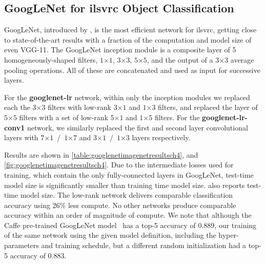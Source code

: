 \documentclass[thesis]{subfiles}
\begin{document}
    \subsection{GoogLeNet for \gls{ilsvrc} Object Classification}
    GoogLeNet, introduced by \citet{Szegedy2014going}, is the most efficient network for \gls{ilsvrc}, getting close to state-of-the-art results with a fraction of the computation and model size of even VGG-11. The GoogLeNet \gls{inception} module is a composite layer of 5 homogeneously-shaped filters, $1$$\times$$1$, $3$$\times$$3$, $5$$\times$$5$, and the output of a 3$\times$3 average pooling operations. All of these are concatenated and used as input for successive layers. 
    
    For the \textbf{googlenet-lr} network, within only the \gls{inception} modules we replaced each the $3$$\times$$3$ filters with low-rank $3$$\times$$1$ and $1$$\times$$3$ filters, and replaced the layer of $5$$\times$$5$ filters with a set of low-rank $5$$\times$$1$ and $1$$\times$$5$ filters. For the \textbf{googlenet-lr-conv1} network, we similarly replaced the first and second layer convolutional layers with $7$$\times$$1$~/~$1$$\times$$7$ and $3$$\times$$1$~/~$1$$\times$$3$ layers respectively.
    
    Results are shown in \cref{table:googlenetimagenetresultsch4}, and \cref{fig:googlenetimagenetresultsch4}. Due to the intermediate losses used for training, which contain the only fully-connected layers in GoogLeNet, test-time model size is significantly smaller than training time model size.  also reports test-time model size. The low-rank network delivers comparable classification accuracy using 26\% less compute.  No other networks produce comparable accuracy within an order of magnitude of compute. We note that although the Caffe pre-trained GoogLeNet model~\citep{Jia2014} has a top-5 accuracy of 0.889, our training of the same network using the given model definition, including the hyper-parameters and training schedule, but a different random initialization had a top-5 accuracy of 0.883.
    
\end{document}
